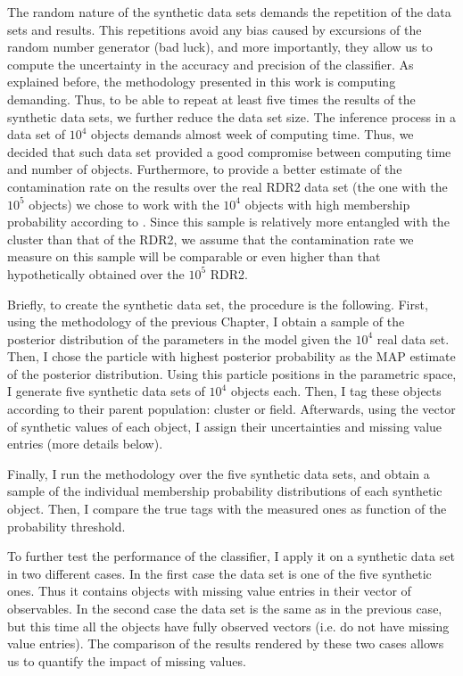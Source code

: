 The random nature of the synthetic data sets demands the repetition of the data sets and results. This repetitions avoid any bias caused by excursions of the random number generator (bad luck), and more importantly, they allow us to compute the uncertainty in the accuracy and precision of the classifier. As explained before, the methodology presented in this work is computing demanding. Thus, to be able to repeat at least five times the results of the synthetic data sets, we further reduce the data set size. The inference process in a data set of $10^4$ objects demands almost week of computing time. Thus, we decided that such data set provided a good compromise between computing time and number of objects. Furthermore, to provide a better estimate of the contamination rate on the results over the real RDR2 data set (the one with the $10^5$ objects) we chose to work with the $10^4$ objects with high membership probability according to \citet{Bouy2015}. Since this sample is relatively more entangled with the cluster than that of the RDR2, we assume that the contamination rate we measure on this sample will be comparable or even higher than that hypothetically obtained over the $10^5$ RDR2. 

Briefly, to create the synthetic data set, the procedure is the following. First, using the methodology of the previous Chapter, I obtain a sample of the posterior distribution of the parameters in the model given the $10^4$ real data set. Then, I chose the particle with highest posterior probability as the MAP estimate of the posterior distribution. Using this particle positions in the parametric space, I generate five synthetic data sets of $10^4$ objects each. Then, I tag these objects according to their parent population: cluster or field. Afterwards, using the vector of synthetic values of each object, I assign their uncertainties and missing value entries (more details  below).

Finally, I run the methodology over the five synthetic data sets, and obtain a sample of the individual membership probability distributions of each synthetic object. Then, I compare the true tags with the measured ones as function of the probability threshold. 

To further test the performance of the classifier, I apply it on a synthetic data set in two different cases. In the first case the data set is one of the five synthetic ones. Thus it contains objects with missing value entries in their vector of observables.  In the second case the data set is the same as in the previous case, but this time all the objects have fully observed vectors (i.e. do not have missing value entries). The comparison of the results rendered by these two cases allows us to quantify the impact of missing values. 

